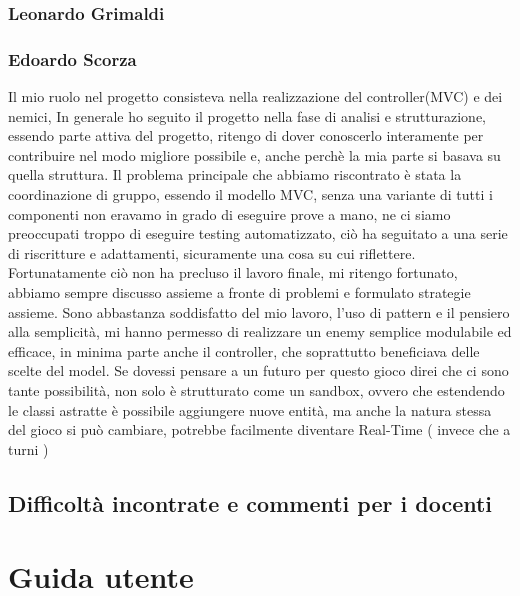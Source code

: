 \documentclass[a4paper,12pt]{report}
\begin{document}
\subsection*{Leonardo Grimaldi}

\subsection*{Edoardo Scorza}

Il mio ruolo nel progetto consisteva nella realizzazione del controller(MVC) e dei nemici,
In generale ho seguito il progetto nella fase di analisi e strutturazione, essendo parte attiva del progetto, ritengo di dover conoscerlo interamente
per contribuire nel modo migliore possibile e, anche perchè la mia parte si basava su quella struttura.
Il problema principale che abbiamo riscontrato è stata la coordinazione di gruppo, essendo il modello MVC, senza una variante di tutti i componenti non eravamo 
in grado di eseguire prove a mano, ne ci siamo preoccupati troppo di eseguire testing automatizzato, ciò ha seguitato a una serie
di riscritture e adattamenti, sicuramente una cosa su cui riflettere.
Fortunatamente ciò non ha precluso il lavoro finale, mi ritengo fortunato, abbiamo sempre discusso assieme a fronte di 
problemi e formulato strategie assieme. Sono abbastanza soddisfatto del mio lavoro, l'uso di pattern e il pensiero alla semplicità, mi hanno permesso
di realizzare un enemy semplice modulabile ed efficace, in minima parte anche il controller, che soprattutto beneficiava delle scelte del model.
Se dovessi pensare a un futuro per questo gioco direi che ci sono tante possibilità, non solo è strutturato come un sandbox, ovvero che estendendo 
le classi astratte è possibile aggiungere nuove entità, ma anche la natura stessa del gioco si può cambiare, potrebbe facilmente diventare Real-Time ( invece che a turni )
\section{Difficoltà incontrate e commenti per i docenti}

\appendix
\chapter{Guida utente}
\end{document}
